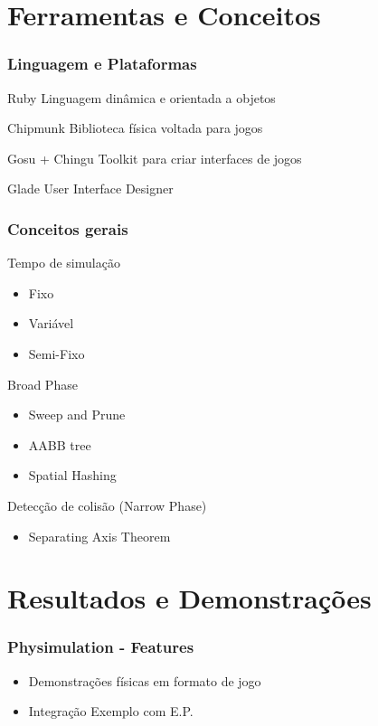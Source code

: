 \documentclass{beamer}
\begin{document}
\section{Ferramentas e Conceitos}
\begin{frame}
  \frametitle{Linguagem e Plataformas}
  \begin{block}{Ruby}
    Linguagem dinâmica e orientada a objetos
  \end{block}
  \begin{block}{Chipmunk}
    Biblioteca física voltada para jogos
  \end{block}
  \begin{block}{Gosu + Chingu}
    Toolkit para criar interfaces de jogos
  \end{block}
  \begin{block}{Glade}
    User Interface Designer
  \end{block}
\end{frame}
\begin{frame}
  \frametitle{Conceitos gerais}
  \begin{block}{Tempo de simulação}
    \begin{itemize}
      \item Fixo
      \item Variável
      \item Semi-Fixo
    \end{itemize}
  \end{block}
  \begin{block}{Broad Phase}
    \begin{itemize}
      \item Sweep and Prune
      \item AABB tree
      \item Spatial Hashing
    \end{itemize}
  \end{block}
  \begin{block}{Detecção de colisão (Narrow Phase)}
    \begin{itemize}
      \item Separating Axis Theorem
    \end{itemize}
  \end{block}
\end{frame}
\section{Resultados e Demonstrações} 

\begin{frame}
  \frametitle{Physimulation - Features}
    \begin{itemize}
      \item Demonstrações físicas em formato de jogo
      \item Integração Exemplo com E.P.
    \end{itemize} 
\end{frame}
\end{document}
